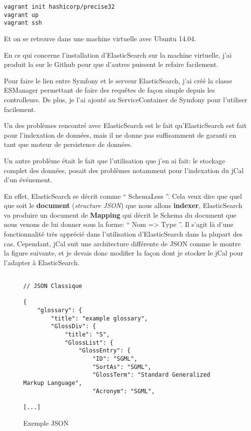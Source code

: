 \begin{lstlisting}
vagrant init hashicorp/precise32
vagrant up
vagrant ssh
\end{lstlisting}

Et on se retrouve dans une machine virtuelle avec Ubuntu 14.04.

En ce qui concerne l'installation d'ElasticSearch sur la machine virtuelle, j'ai produit la  sur le Github pour que d'autres puissent le refaire facilement.

Pour faire le lien entre Symfony et le serveur ElasticSearch, j'ai créé la classe ESManager permettant de faire des requêtes de façon simple depuis les controlleurs. De plus, je l'ai ajouté au ServiceContainer de Symfony pour l'utiliser facilement.

Un des problèmes rencontré avec ElasticSearch est le fait qu'ElasticSearch est fait pour l'indexation de données, mais il ne donne pas suffisamment de garanti en tant que moteur de persistence de données.

Un autre problème était le fait que l'utilisation que j'en ai fait: le stockage complet des données, posait des problèmes notamment pour l'indexation du jCal d'un événement.

En effet, ElasticSearch se décrit comme `` SchemaLess ''. Cela veux dire que quel que soit le \textbf{document} (\textit{structure JSON}) que nous allons \textbf{indexer}, ElasticSearch va produire un document de \textbf{Mapping} qui décrit le Schema du document que nous venons de lui donner sous la forme: `` Nom => Type ''. Il s'agit là d'une fonctionnalité très apprécié dans l'utilisation d'ElasticSearch dans la plupart des cas. Cependant, jCal suit une architecture différente de JSON comme le montre la figure suivante, et je devais donc modifier la façon dont je stocker le jCal pour l'adapter à ElasticSearch.

\begin{figure}[h]
\begin{lstlisting}[frame=single]

// JSON Classique

{
    "glossary": {
        "title": "example glossary",
        "GlossDiv": {
            "title": "S",
            "GlossList": {
                "GlossEntry": {
                    "ID": "SGML",
                    "SortAs": "SGML",
                    "GlossTerm": "Standard Generalized Markup Language",
                    "Acronym": "SGML",

[...]

\end{lstlisting}
\caption{Exemple JSON}
\end{figure}

